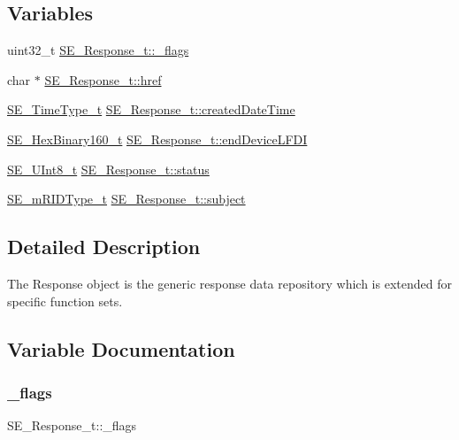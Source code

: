 \subsection*{Variables}
\begin{DoxyCompactItemize}
\item 
uint32\+\_\+t \hyperlink{group__Response_ga23e952b1bb39c00c2b0686ef6d8ac02f}{S\+E\+\_\+\+Response\+\_\+t\+::\+\_\+flags}
\item 
char $\ast$ \hyperlink{group__Response_gad5bd6b0cc37466b254ddff1efd5cd74f}{S\+E\+\_\+\+Response\+\_\+t\+::href}
\item 
\hyperlink{group__TimeType_ga6fba87a5b57829b4ff3f0e7638156682}{S\+E\+\_\+\+Time\+Type\+\_\+t} \hyperlink{group__Response_ga45bb118c1fa5e91243ebcb39d47c5726}{S\+E\+\_\+\+Response\+\_\+t\+::created\+Date\+Time}
\item 
\hyperlink{group__HexBinary160_ga92b92aa55555bdb75f3a59060f2c1632}{S\+E\+\_\+\+Hex\+Binary160\+\_\+t} \hyperlink{group__Response_ga3b3495ba64ae18f96b7fb7c4f6c68d59}{S\+E\+\_\+\+Response\+\_\+t\+::end\+Device\+L\+F\+DI}
\item 
\hyperlink{group__UInt8_gaf7c365a1acfe204e3a67c16ed44572f5}{S\+E\+\_\+\+U\+Int8\+\_\+t} \hyperlink{group__Response_gac086b296f75d2f0ff0eecf0fd9271c75}{S\+E\+\_\+\+Response\+\_\+t\+::status}
\item 
\hyperlink{group__mRIDType_gac74622112f3a388a2851b2289963ba5e}{S\+E\+\_\+m\+R\+I\+D\+Type\+\_\+t} \hyperlink{group__Response_gac727cbc06cbfcea07b72fd18c0d1bf24}{S\+E\+\_\+\+Response\+\_\+t\+::subject}
\end{DoxyCompactItemize}


\subsection{Detailed Description}
The Response object is the generic response data repository which is extended for specific function sets. 

\subsection{Variable Documentation}
\mbox{\label{group__Response_ga23e952b1bb39c00c2b0686ef6d8ac02f}} 
\subsubsection{\texorpdfstring{\+\_\+flags}{\_flags}}
{\footnotesize\ttfamily S\+E\+\_\+\+Response\+\_\+t\+::\+\_\+flags}

